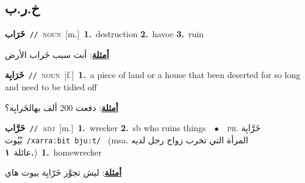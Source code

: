 \documentclass[10pt,a4paper,twoside]{article} %
\begin{document}
\begin{multicols}{2}
{{{{{{{{{{\vspace{-3mm}
\subsection*{\color{blue}\foreignlanguage{arabic}{خ.ر.ب}\color{blue}{}} 

{\setlength\topsep{0pt}\textbf{\foreignlanguage{arabic}{خَرَاب}}\ {\color{gray}\texttt{//}\color{black}}\ \textsc{noun}\ [m.]\ \textbf{1.}~destruction  \textbf{2.}~havoc  \textbf{3.}~ruin\  \begin{flushright}\color{gray}\foreignlanguage{arabic}{\textbf{\underline{\foreignlanguage{arabic}{أمثلة}}}: أنت سبب خَراب الأرض}\end{flushright}\color{black}} \vspace{2mm}

{\setlength\topsep{0pt}\textbf{\foreignlanguage{arabic}{خَرَابِة}}\ {\color{gray}\texttt{//}\color{black}}\ \textsc{noun}\ [f.]\ \textbf{1.}~a piece of land or a house that been deserted for so long and need to be tidied off\  \begin{flushright}\color{gray}\foreignlanguage{arabic}{\textbf{\underline{\foreignlanguage{arabic}{أمثلة}}}: دفعت 200 ألف بهالخَرابِة؟}\end{flushright}\color{black}} \vspace{2mm}

{\setlength\topsep{0pt}\textbf{\foreignlanguage{arabic}{خَرَّاب}}\ {\color{gray}\texttt{//}\color{black}}\ \textsc{adj}\ [m.]\ \textbf{1.}~wrecker  \textbf{2.}~sb who ruins things\ \ $\bullet$\ \ \textsc{ph.} \color{gray} \foreignlanguage{arabic}{خَرَّابِة بْيُوت}\color{black}\ {\color{gray}\texttt{/{\sffamily xarraːbit bjuːt}/}\color{black}}\ \color{gray} (msa. \foreignlanguage{arabic}{المرأة التي تخرب زواج رجل لديه عائلة}~\foreignlanguage{arabic}{\textbf{١.}})\color{black}\ \textbf{1.}~homewrecker\  \begin{flushright}\color{gray}\foreignlanguage{arabic}{\textbf{\underline{\foreignlanguage{arabic}{أمثلة}}}: ليش تجوَّز خَرّابِة بيوت هاي}\end{flushright}\color{black}} \vspace{2mm}

}}}}}}}}}}
\end{multicols}
\end{document}
